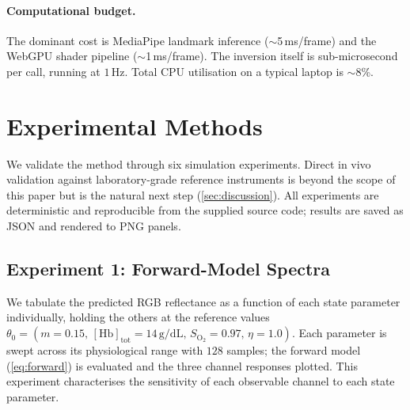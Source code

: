 \documentclass[10pt,twocolumn,a4paper]{article}
\theoremstyle{definition}
\newcommand{\Hb}{\mathrm{Hb}}
\newcommand{\vaso}{\eta}
\newcommand{\melan}{m}
\newcommand{\Hbconc}{[\Hb]_{\mathrm{tot}}}
\newcommand{\Soxy}{S_{\mathrm{O_2}}}
\begin{document}
\paragraph{Computational budget.} The dominant cost is MediaPipe
landmark inference ($\sim$5\,ms/frame) and the WebGPU shader pipeline
($\sim$1\,ms/frame). The inversion itself is sub-microsecond per call,
running at $1\,\mathrm{Hz}$. Total CPU utilisation on a typical
laptop is $\sim$8\%.



\section{Experimental Methods}\label{sec:methods}

We validate the method through six simulation experiments. Direct
in vivo validation against laboratory-grade reference instruments is
beyond the scope of this paper but is the natural next step
(\cref{sec:discussion}). All experiments are deterministic and
reproducible from the supplied source code; results are saved as JSON
and rendered to PNG panels.

\subsection{Experiment 1: Forward-Model Spectra}

We tabulate the predicted RGB reflectance as a function of each state
parameter individually, holding the others at the reference values
$\theta_{0}=(\melan{=}0.15,\, \Hbconc{=}14\,\mathrm{g/dL},\,
\Soxy{=}0.97,\, \vaso{=}1.0)$. Each parameter is swept across its
physiological range with $128$ samples; the forward model
(\cref{eq:forward}) is evaluated and the three channel responses
plotted. This experiment characterises the sensitivity of each
observable channel to each state parameter.
\end{document}
